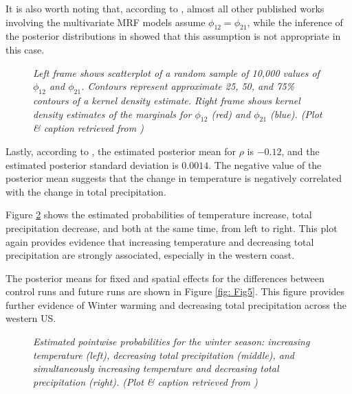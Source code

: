 \documentclass{article}
\begin{document}
It is also worth noting that, according to \cite{paper}, almost all other published works involving the multivariate MRF models assume $\phi_{12} = \phi_{21}$, while the inference of the posterior distributions in \cite{paper} showed that this assumption is not appropriate in this case.

\begin{figure}
  \centering
  \caption{\small \emph{Left frame shows scatterplot of a random sample of 10,000 values of $\phi_{12}$ and $\phi_{21}$. Contours represent approximate 25, 50, and 75\% contours of a kernel density estimate. Right frame shows kernel density estimates of the marginals for $\phi_{12}$ (red) and $\phi_{21}$ (blue). (Plot \& caption retrieved from \cite{paper})}}
  \label{fig: Fig4}
\end{figure}

Lastly, according to \cite{paper}, the estimated posterior mean for $\rho$ is $-0.12$, and the estimated posterior standard deviation is $0.0014$. The negative value of the posterior mean suggests that the change in temperature is negatively correlated with the change in total precipitation. 

Figure \ref{fig: Fig7} shows the estimated probabilities of temperature increase, total precipitation decrease, and both at the same time, from left to right. This plot again provides evidence that increasing temperature and decreasing total precipitation are strongly associated, especially in the western coast. 

The posterior means for fixed and spatial effects for the differences between control runs and future runs are shown in Figure \ref{fig: Fig5}. This figure provides further evidence of Winter warming and decreasing total precipitation across the western US. 

\begin{figure}
  \centering
  \caption{\small \emph{Estimated pointwise probabilities for the winter season: increasing temperature (left), decreasing total precipitation (middle), and simultaneously increasing temperature and decreasing total precipitation (right). (Plot \& caption retrieved from \cite{paper})}}
  \label{fig: Fig7}
\end{figure}
\end{document}
